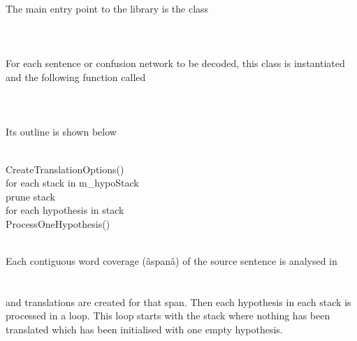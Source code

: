 \documentclass[11pt]{book}
\theoremstyle{plain}
\begin{document}
The main entry point to the library is the class\\
\\
\\
\\
For each sentence or confusion network to be decoded, this class is instantiated and the following function called\\
\\
\\
\\
Its outline is shown below\\
\\
\begin{tt}
\indent CreateTranslationOptions()\\
\indent for each stack in m\_hypoStack\\
\indent \indent prune stack\\
\indent \indent for each hypothesis in stack\\
\indent \indent \indent ProcessOneHypothesis()\\
\end{tt}\\
Each contiguous word coverage (âspanâ) of the source sentence is analysed in\\ 
\\
\\
and translations are created for that span. Then each hypothesis in each stack is processed in a loop. This loop starts with the stack where nothing has been translated which has been initialised with one empty hypothesis.
\\
\end{document}
